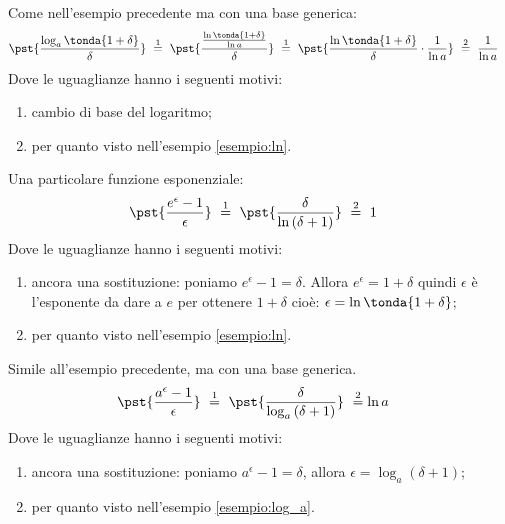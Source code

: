 \begin{esempio}
\label{esempio:log_a}
Come nell'esempio precedente ma con una base generica:
\begin{align*}
 &\pst{\dfrac{\log_a\tonda{1+\delta}}{\delta}}~\stackrel{1}{=} ~  
 \pst{\dfrac{\frac{\ln\tonda{1+\delta}}{\ln a}}{\delta}}~\stackrel{1}{=} ~
 \pst{\dfrac{\ln\tonda{1+\delta}}{\delta}\cdot \dfrac{1}{\ln a}}
 ~ \stackrel{2}{=} ~
 \dfrac{1}{\ln a}
\end{align*}
Dove le uguaglianze hanno i seguenti motivi:
\begin{enumerate} [nosep]
 \item cambio di base del logaritmo;
 \item per quanto visto nell'esempio \ref{esempio:ln}.
\end{enumerate}
\end{esempio}


\begin{esempio}
Una particolare funzione esponenziale:
\begin{align*}
&\pst{\dfrac{e^\epsilon-1}{\epsilon}}
~ \stackrel{1}{=} ~  
\pst{\dfrac{\delta}{\ln{(\delta+1)}}}~ \stackrel{2}{=} ~ 1
\end{align*}
Dove le uguaglianze hanno i seguenti motivi:
\begin{enumerate} [nosep]
 \item ancora una sostituzione: poniamo \(e^\epsilon-1=\delta\). 
Allora \(e^\epsilon = 1+\delta\) quindi \(\epsilon\) è l'esponente da dare 
a \(e\) per ottenere \(1+\delta\) cioè: 
\(\epsilon = \ln{\tonda{1+\delta}}\);
 \item per quanto visto nell'esempio \ref{esempio:ln}.
\end{enumerate}
\end{esempio}

\begin{esempio}
Simile all'esempio precedente, ma con una base generica.
\begin{align*}
&\pst{\dfrac{a^\epsilon-1}{\epsilon}}
~ \stackrel{1}{=} ~  
\pst{\dfrac{\delta}{\log_a{(\delta+1)}}}~ \stackrel{2}{=}\ln{a}
\end{align*}
Dove le uguaglianze hanno i seguenti motivi:
\begin{enumerate} [nosep]
 \item ancora una sostituzione: poniamo
\(a^\epsilon-1=\delta\), allora \(\epsilon=\log_a(\delta+1)\);
 \item per quanto visto nell'esempio \ref{esempio:log_a}.
\end{enumerate}
\end{esempio}


